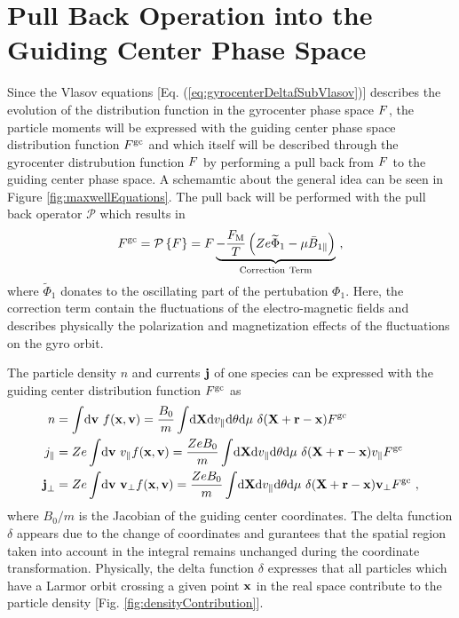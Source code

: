\section{Pull Back Operation into the Guiding Center Phase Space}
\label{sec:pullback}

Since the Vlasov equations [Eq. (\ref{eq:gyrocenterDeltafSubVlasov})] describes the evolution of the distribution function in the gyrocenter phase space $F$, the particle moments will be expressed with the guiding center phase space distribution function $F^\mathrm{gc}$ and which itself will be described through the gyrocenter distrubution function $F$ by performing a pull back from $F$ to the guiding center phase space. A schemamtic about the general idea can be seen in Figure \ref{fig:maxwellEquations}. The pull back will be performed with the pull back operator $\mathcal{P}$ which results in
\begin{gather}
	F^\mathrm{gc} = \mathcal{P} \left\{ F \right\} = F \underbrace{- \frac{F_\mathrm{M}}{T}\left(Ze \widetilde{\Phi}_1 - \mu \bar{B}_{1\parallel}\right)}_{\mathrm{Correction~Term}}~,
	\label{eq:pullback}
\end{gather}
where $\widetilde{\Phi}_1$ donates to the oscillating part of the pertubation $\Phi_1$. Here, the correction term contain the fluctuations of the electro-magnetic fields and describes physically the polarization and magnetization effects of the fluctuations on the gyro orbit. \cite{Brizard2007}
 

The particle density $n$ and currents $\boldsymbol{\mathbf{j}}$ of one species can be expressed with the guiding center distribution function $F^\mathrm{gc}$ as
\begin{gather}
	\begin{aligned}
		n &= \int \! \mathrm{d}\boldsymbol{\mathbf{v}} ~ f(\boldsymbol{\mathbf{x}}, \boldsymbol{\mathbf{v}}) = \frac{B_0}{m} \int \! \mathrm{d}\boldsymbol{\mathbf{X}}\mathrm{d}v_\parallel\mathrm{d}\theta\mathrm{d}\mu ~ \delta(\boldsymbol{\mathbf{X}} + \boldsymbol{\mathbf{r}} - \boldsymbol{\mathbf{x}}) F^\mathrm{gc} \\
		j_\parallel &= Ze \int \! \mathrm{d}\boldsymbol{\mathbf{v}} ~ v_\parallel f(\boldsymbol{\mathbf{x}}, \boldsymbol{\mathbf{v}})= \frac{Ze B_0}{m} \int \! \mathrm{d}\boldsymbol{\mathbf{X}}\mathrm{d}v_\parallel\mathrm{d}\theta\mathrm{d}\mu ~ \delta(\boldsymbol{\mathbf{X}} + \boldsymbol{\mathbf{r}} - \boldsymbol{\mathbf{x}}) v_\parallel F^\mathrm{gc} \\
		\boldsymbol{\mathbf{j}}_\perp &= Ze \int \! \mathrm{d}\boldsymbol{\mathbf{v}} ~ \boldsymbol{\mathbf{v}}_\perp f(\boldsymbol{\mathbf{x}}, \boldsymbol{\mathbf{v}}) = \frac{Ze B_0}{m} \int \! \mathrm{d}\boldsymbol{\mathbf{X}}\mathrm{d}v_\parallel\mathrm{d}\theta\mathrm{d}\mu ~ \delta(\boldsymbol{\mathbf{X}} + \boldsymbol{\mathbf{r}} - \boldsymbol{\mathbf{x}}) \boldsymbol{\mathbf{v}}_\perp F^\mathrm{gc} ~,
	\end{aligned}
	\label{eq:momentsGuidingCenter}
\end{gather}
where $B_0/m$ is the Jacobian of the guiding center coordinates. The delta function $\delta$ appears due to the change of coordinates and gurantees that the spatial region taken into account in the integral remains unchanged during the coordinate transformation. Physically, the delta function $\delta$ expresses that all particles which have a Larmor orbit crossing a given point $\boldsymbol{\mathbf{x}}$ in the real space contribute to the particle density [Fig. \ref{fig:densityContribution}]. 

